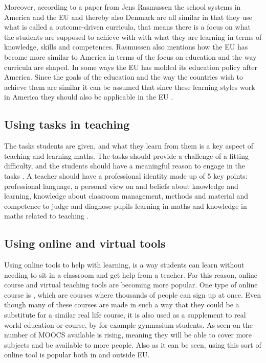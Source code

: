 \newline\newline
Moreover, according to a paper from Jens Rasmussen \cite{Rasmussen2013CompetenceHotel} the school systems in America and the EU and thereby also Denmark are all similar in that they use what is called a outcome-driven curricula, that means there is a focus on what the students are supposed to achieve with with what they are learning in terms of knowledge, skills and competences. Rasmussen also mentions how the EU has become more similar to America in terms of the focus on education and the way curricula are shaped. In some ways the EU has molded its education policy after America. Since the goals of the education and the way the countries wish to achieve them are similar it can be assumed that since these learning styles work in America they should also be applicable in the EU \cite{Rasmussen2013CompetenceHotel}. 

\subsection{Using tasks in teaching}
The tasks students are given, and what they learn from them is a key aspect of teaching and learning maths. The tasks should provide a challenge of a fitting difficulty, and the students should have a meaningful reason to engage in the tasks \cite{Clarke2009Tasks123}.
\newline\indent
A teacher should have a professional identity made up of 5 key points: professional language, a personal view on and beliefs about knowledge and learning, knowledge about classroom management, methods and material and competence to judge and diagnose pupils learning in maths and knowledge in maths related to teaching \cite{Clarke2009Tasks123}.

\subsection{Using online and virtual tools}
\label{sub:using_online_and_virtual_tools}
Using online tools to help with learning, is a way students can learn without needing to sit in a classroom and get help from a teacher. For this reason, online course and virtual teaching tools are becoming more popular. One type of online course is , which are courses where thousands of people can sign up at once. Even though many of these courses are made in such a way that they could be a substitute for a similar real life course, it is also used as a supplement to real world education or course, by for example gymnasium students. As seen on  the number of MOOCS available is rising, meaning they will be able to cover more subjects and be available to more people. Also as it can be seen, using this sort of online tool is popular both in and outside EU.

